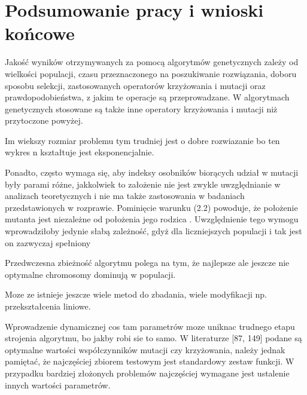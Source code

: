 \chapter{Podsumowanie pracy i wnioski końcowe}\label{cha:pierwszyDokument}

Jakość wyników otrzymywanych za pomocą algorytmów genetycznych zależy
od wielkości populacji, czasu przeznaczonego na poszukiwanie rozwiązania, doboru
sposobu selekcji, zastosowanych operatorów krzyżowania i mutacji oraz prawdopodobieństwa, z jakim te operacje są przeprowadzane. W algorytmach genetycznych
stosowane są także inne operatory krzyżowania i mutacji niż przytoczone powyżej. \\
\par
Im wiekszy rozmiar problemu tym trudniej jest o dobre rozwiazanie bo ten wykres n kształtuje jest eksponencjalnie.\\
\par
 Ponadto,
często wymaga się, aby indeksy osobników biorących udział w mutacji były parami
różne, jakkolwiek to założenie nie jest zwykle uwzględnianie w analizach teoretycznych
i nie ma także zastosowania w badaniach przedstawionych w rozprawie. Pominięcie
warunku (2.2) powoduje, że położenie mutanta 
jest niezależne od położenia jego
rodzica \cite{diff2}
. Uwzględnienie tego wymogu wprowadziłoby jedynie słabą zależność,
gdyż dla liczniejszych populacji i tak jest on zazwyczaj spełniony
\par
Przedwczesna zbieżność algorytmu polega na tym, że najlepsze ale jeszcze nie optymalne chromosomy
dominują w populacji. 
\par
Moze ze istnieje jeszcze wiele metod do zbadania, wiele modyfikacji np. przekształcenia liniowe.
\par
Wprowadzenie dynamicznej cos tam parametrów moze uniknac trudnego etapu strojenia algorytmu, bo jakby robi sie to samo. W literaturze [87, 149] podane są
optymalne wartości współczynników mutacji czy krzyżowania, należy jednak pamiętać, że najczęściej zbiorem testowym jest standardowy zestaw funkcji. W przypadku bardziej złożonych problemów najczęściej wymagane jest ustalenie innych
wartości parametrów.
